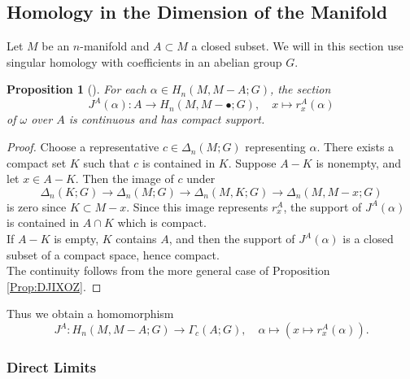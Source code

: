 \documentclass[reqno]{amsart}
\newtheorem{proposition}[theorem]{Proposition}
\theoremstyle{definition}
\theoremstyle{remark}
\begin{document}
\subsection{Homology in the Dimension of the Manifold}

Let $M$ be an $n$-manifold and $A \subset M$ a closed subset.
We will in this section use singular homology with coefficients
in an abelian group $G$.


\begin{proposition}[]
    For each $\alpha \in H_n(M, M - A ; G)$, the
    section
    \[
    J^{A}(\alpha) \colon
    A \to H_n(M, M - \bullet; G),
    \quad x \mapsto r_x^{A} (\alpha)
    \] 
    of $\omega$ over $A$ is continuous and has
    compact support.
\end{proposition}

\begin{proof}
    Choose a representative
    $c \in \Delta_n(M;G)$ representing $\alpha$.
    There exists a compact set $K$ such that
    $c$ is contained in $K$.
    Suppose $A - K$ is nonempty, and let $x \in A - K$.
    Then the image of $c$ under
    \[
    \Delta_n (K ; G) \to 
    \Delta_n(M;G) \to \Delta_n (M,K;G) 
    \to \Delta_n (M, M - x ; G)
    \] 
    is zero since
    $K \subset M - x$. Since this image
    represents
    $r_x^{A}$, the support of $J^{A}(\alpha)$ is
    contained in $A \cap K$ which is compact.\\
    If $A - K$ is empty, $K$ contains $A$, and then
    the support of $J ^{A}(\alpha)$ is a closed
    subset of a compact space, hence compact.\\
    \linebreak
    The continuity follows from the more general case of
    Proposition \ref{Prop:DJIXOZ}.
\end{proof}

Thus we obtain a homomorphism
\[
J^{A} \colon H_n(M, M - A; G) \to 
\Gamma_c (A;G), \quad
\alpha \mapsto \left( x \mapsto r_x^{A}(\alpha) \right) .
\] 



\subsubsection{Direct Limits}
\end{document}
